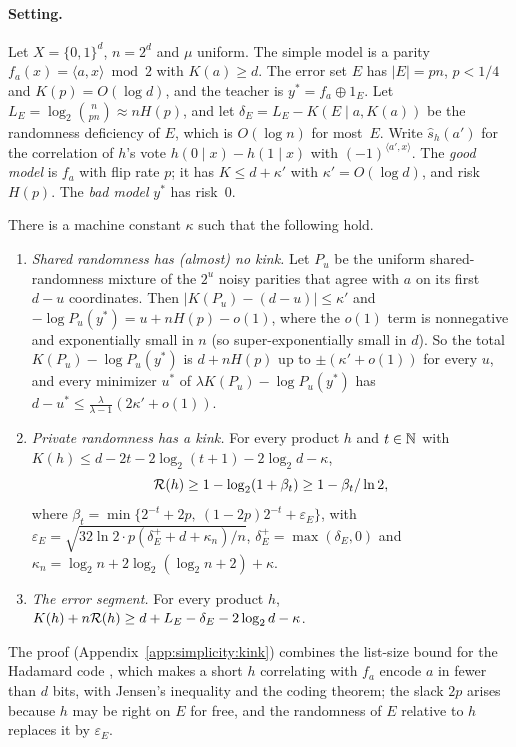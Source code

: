 \paragraph{Setting.} Let $X=\{0,1\}^d$, $n=2^d$ and $\mu$ uniform. The simple model is a parity $f_a(x)=\langle a,x\rangle\bmod2$ with $K(a)\ge d$. The error set $E$ has $|E|=pn$, $p<1/4$ and $K(p)=O(\log d)$, and the teacher is $y^*=f_a\oplus1_E$. Let $L_E=\log_2\binom n{pn}\approx nH(p)$, and let $\delta_E=L_E-K(E\mid a,K(a))$ be the randomness deficiency of $E$, which is $O(\log n)$ for most~$E$. Write $\hat s_h(a')$ for the correlation of $h$'s vote $h(0\mid x)-h(1\mid x)$ with $(-1)^{\langle a',x\rangle}$. The \emph{good model} is $f_a$ with flip rate $p$; it has $K\le d+\kappa'$ with $\kappa'=O(\log d)$, and risk $H(p)$. The \emph{bad model} $y^*$ has risk~$0$.

\begin{theorem}[Kink]\label{thm:simplicity:kink}
There is a machine constant $\kappa$ such that the following hold.
\begin{enumerate}[label=(\alph*)]
\item \emph{Shared randomness has (almost) no kink.} Let $P_u$ be the uniform shared-randomness mixture of the $2^u$ noisy parities that agree with $a$ on its first $d-u$ coordinates. Then $|K(P_u)-(d-u)|\le\kappa'$ and $-\log P_u(y^*)=u+nH(p)-o(1)$, where the $o(1)$ term is nonnegative and exponentially small in $n$ (so super-exponentially small in $d$). So the total $K(P_u)-\log P_u(y^*)$ is $d+nH(p)$ up to $\pm(\kappa'+o(1))$ for every $u$, and every minimizer $u^*$ of $\lambda K(P_u)-\log P_u(y^*)$ has $d-u^*\le\frac\lambda{\lambda-1}(2\kappa'+o(1))$.
\item \emph{Private randomness has a kink.} For every product $h$ and $t\in\mathbb{N}$ with $K(h)\le d-2t-2\log_2(t+1)-2\log_2d-\kappa$,
\[
\mathcal R(h)\ge1-\log_2(1+\beta_t)\ge1-\beta_t/\ln2,
\]
where $\beta_t=\min\{2^{-t}+2p,\ (1-2p)2^{-t}+\varepsilon_E\}$, with $\varepsilon_E=\sqrt{32\ln2\cdot p(\delta_E^++d+\kappa_n)/n}$, $\delta_E^+=\max(\delta_E,0)$ and $\kappa_n=\log_2n+2\log_2(\log_2n+2)+\kappa$.
\item \emph{The error segment.} For every product $h$, $K(h)+n\mathcal R(h)\ge d+L_E-\delta_E-2\log_2d-\kappa$.
\end{enumerate}
\end{theorem}

The proof (Appendix~\ref{app:simplicity:kink}) combines the list-size bound for the Hadamard code \citep{goldreich1989hard,kushilevitz1993learning}, which makes a short $h$ correlating with $f_a$ encode $a$ in fewer than $d$ bits, with Jensen's inequality and the coding theorem; the slack $2p$ arises because $h$ may be right on $E$ for free, and the randomness of $E$ relative to $h$ replaces it by $\varepsilon_E$.

